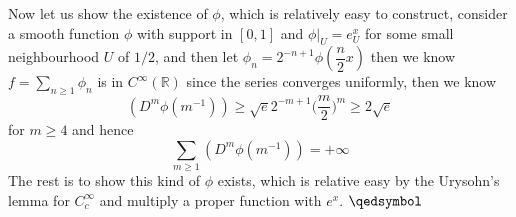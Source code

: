 \documentclass[lang=en,11pt,a4paper,citestyle =authoryear]{elegantpaper}
\newcommand{\prvd}{$\hfill \qedsymbol$}
\newcommand{\R}{\mathbb{R}}
\begin{document}
Now let us show the existence of $\phi$, which is relatively easy to construct, consider a smooth function $\phi$ with support in $[0,1]$ and $\phi|_U = e^x_U$ for some small neighbourhood $U$ of $1/2$, and then let $\phi_n = 2^{-n+1}\phi(\dfrac{n}{2}x)$ then we know $f = \sum\limits_{n\geq 1} \phi_n$ is in $C^{\infty}(\R)$ since the series converges uniformly, then we know
\[(D^m\phi(m^{-1})) \geq \sqrt{e}2^{-m+1}\Big(\dfrac{m}{2}\Big)^m \geq 2\sqrt{e}\]
for $m\geq 4$ and hence
\[\sum\limits_{m\geq 1}(D^m\phi(m^{-1})) = +\infty\]
The rest is to show this kind of $\phi$ exists, which is relative easy by the Urysohn's lemma for $C_c^{\infty}$ and multiply a proper function with $e^x$.
\prvd

\addappheadtotoc
\end{document}
